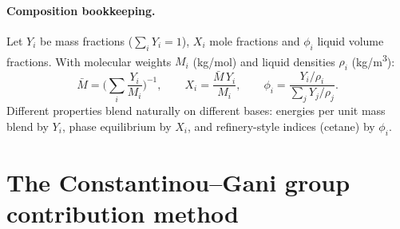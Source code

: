 \documentclass[11pt]{article}
\begin{document}
\paragraph{Composition bookkeeping.}
Let $Y_i$ be mass fractions ($\sum_i Y_i = 1$), $X_i$ mole fractions and
$\phi_i$ liquid volume fractions. With molecular weights $M_i$
(\si{kg/mol}) and liquid densities $\rho_i$ (\si{kg/m^3}):
\begin{equation}
  \bar{M} = \Big( \sum_i \frac{Y_i}{M_i} \Big)^{-1}, \qquad
  X_i = \frac{\bar{M}\, Y_i}{M_i}, \qquad
  \phi_i = \frac{Y_i/\rho_i}{\sum_j Y_j/\rho_j}.
\end{equation}
Different properties blend naturally on different bases: energies per unit
mass blend by $Y_i$, phase equilibrium by $X_i$, and refinery-style indices
(cetane) by $\phi_i$.

\section{The Constantinou--Gani group contribution method}
\end{document}
